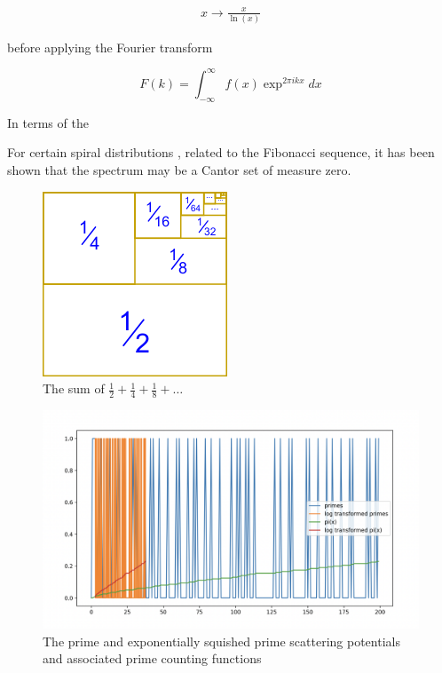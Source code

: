 \documentclass[aps,prb,twocolumn,superscriptaddress]{revtex4}
\begin{document}
\begin{align}
x \rightarrow \frac{x}{\ln(x)}
\end{align}

before applying the Fourier transform 

\begin{equation}
F(k) = \int_{-\infty}^{\infty}f(x)\exp^{2\pi ikx}dx
\end{equation}

In terms of the 



For certain spiral distributions \cite{Varma2016}, related to the Fibonacci sequence, it has been shown that the spectrum may be a Cantor set of measure zero.




\begin{figure}[h]
  \centering
  \includegraphics[width=0.5\columnwidth]{square_fractions.png}
  \caption{The sum of $\frac{1}{2} + \frac{1}{4} + \frac{1}{8} + \ldots$}
\end{figure}

\begin{figure}[h]
  \centering
    \includegraphics[width=0.5\columnwidth]
  {primes.png}
    \caption{The prime and exponentially squished prime scattering potentials and associated prime counting functions}
\end{figure}
\end{document}
